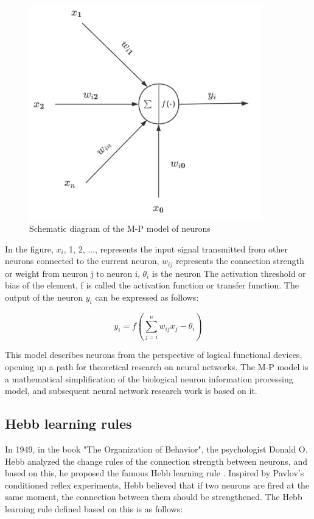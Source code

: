 \documentclass[paper=a4, fontsize=11pt]{scrartcl} %
\numberwithin{equation}{section} %
\numberwithin{figure}{section} %
\numberwithin{table}{section} %
\begin{document}
\begin{figure}[H]
    \centering
    \includegraphics[width=0.9\textwidth]{./data/M-P.jpg}
    \caption{Schematic diagram of the M-P model of neurons}
    \label{fig:my_picture}
    \vspace{1pt} %
\end{figure}

In the figure, $x_i$, 1, 2, ..., represents the input signal transmitted from other neurons connected to the current neuron, $w_{ij}$ represents the connection strength or weight from neuron j to neuron i, $\theta_i$ is the neuron The activation threshold or bias of the element, f is called the activation function or transfer function. The output of the neuron $y_i$ can be expressed as follows:

\begin{equation}
    y_i = f(\sum_{j=i}^{n} w_{ij}x_j-\theta_i)
\end{equation}

This model describes neurons from the perspective of logical functional devices, opening up a path for theoretical research on neural networks. The M-P model is a mathematical simplification of the biological neuron information processing model, and subsequent neural network research work is based on it. 



\subsection{Hebb learning rules}
In 1949, in the book "The Organization of Behavior", the psychologist Donald O. Hebb analyzed the change rules of the connection strength between neurons, and based on this, he proposed the famous Hebb learning rule \cite{Hebb2002OrganizationBehaviorNeuropsychological}. Inspired by Pavlov's conditioned reflex experiments, Hebb believed that if two neurons are fired at the same moment, the connection between them should be strengthened. The Hebb learning rule defined based on this is as follows:
\end{document}
